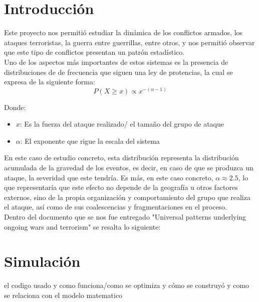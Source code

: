 \documentclass[twoside, a4paper, 12pt, spanish]{article}
\begin{document}

\section{Introducción}

Este proyecto nos permitió estudiar la dinámica de los conflictos armados, los ataques terroristas, la guerra entre guerrillas, entre otros, y nos permitió observar que este tipo de conflictos presentan un patrón estadístico. \\

Uno de los aspectos más importantes de estos sistemas es la presencia de distribuciones de de frecuencia que siguen una ley de protencias,  la cual se expresa de la siguiente forma:\\

$$P(X \geq x) \propto x^{-(\alpha -1)} $$

Donde:
\begin{itemize}
    \item $x$: Es la fuerza del ataque realizado/ el tamaño del grupo de ataque
    \item $\alpha$: El exponente que rigue la escala del sistema
\end{itemize}

En este caso de estudio concreto, esta distribución representa la distribución acumulada de la gravedad de los eventos, es decir, en caso de que se produzca un ataque, la severidad que este tendría. Es más, en este caso concreto, $\alpha \approx 2.5$, lo que representaría que este efecto no depende de la geografía u otros factores externos, sino de la propia organización y comportamiento del grupo que realiza el ataque, así como de sus coalescencias y fragmentaciones en el proceso.\\

Dentro del documento que se nos fue entregado "Universal patterns underlying ongoing wars and terrorism" se resalta lo siguiente: 


\section{Simulación}
el codigo usado y como funciona/como se optimiza y cómo se construyó y como se relaciona con el 
modelo matematico
\end{document}
